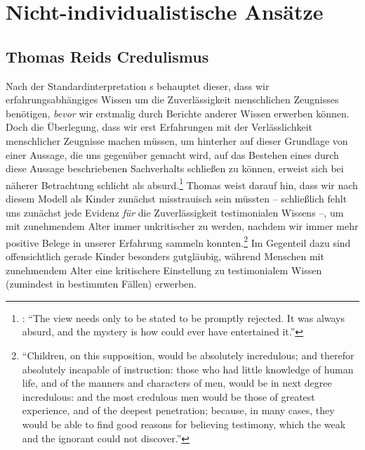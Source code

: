 \section{Nicht-individualistische Ansätze}
\label{section:NichtindividualistischeAnsaetze}
\subsection{Thomas Reids Credulismus}
\label{subsubsection:ThomasReid}
Nach der Standardinterpretation s behauptet dieser, dass wir
erfahrungsabhängiges Wissen um die Zuverlässigkeit menschlichen Zeugnisses
benötigen, \emph{bevor} wir erstmalig durch Berichte anderer Wissen erwerben
können. Doch die Überlegung, dass wir erst Erfahrungen mit der Verlässlichkeit
menschlicher Zeugnisse machen müssen, um hinterher auf dieser Grundlage von
einer Aussage, die uns gegenüber gemacht wird, auf das Bestehen eines durch
diese Aussage beschriebenen Sachverhalts schließen zu können, erweist sich bei
näherer Betrachtung schlicht als absurd.\footnote{\cite[Vgl.][3]{Anscombe:WhatIsIttoBelieveSomeone2008}:
\enquote{The view needs only to be stated to be promptly rejected. It was always
absurd, and the mystery is how  could ever have entertained it.}}
Thomas  weist darauf hin, dass wir nach diesem Modell als Kinder
zunächst misstrauisch sein müssten -- schließlich fehlt uns zunächst jede
Evidenz \emph{für} die Zuverlässigkeit testimonialen Wissens --,
um mit zunehmendem Alter immer unkritischer zu werden, nachdem wir immer mehr
positive Belege in unserer Erfahrung sammeln
konnten.\footnote{\cite[Vgl.][\pno~194\,f.:]{Reid:AnInquiryIntotheHumanMindonthePrinciplesofCommonSense1997}
\enquote{Children, on this supposition, would be absolutely incredulous; and
therefor absolutely incapable of instruction: those who had little knowledge of
human life, and of the manners and characters of men, would be in next degree
incredulous: and the most credulous men would be those of greatest experience,
and of the deepest penetration; because, in many cases, they would be able to
find good reasons for believing testimony, which the weak and the ignorant could
not discover.}} Im Gegenteil dazu sind offensichtlich gerade Kinder besonders
gutgläubig, während Menschen mit zunehmendem Alter eine kritischere Einstellung
zu testimonialem Wissen (zumindest in bestimmten Fällen) erwerben.



